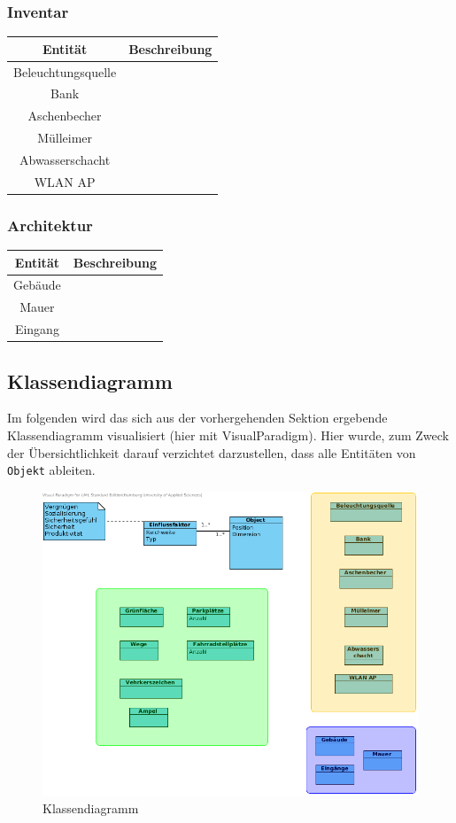 \documentclass[10pt]{scrartcl}
\begin{document}
	\subsubsection{Inventar}
\begin{tabular}{|c|c|}
\hline Entität & Beschreibung \\
\hline
\hline Beleuchtungsquelle &  \\ 
\hline Bank &  \\ 
\hline Aschenbecher &  \\ 
\hline Mülleimer &  \\ 
\hline Abwasserschacht &  \\ 
\hline WLAN AP &  \\ 
\hline 
\end{tabular}

	\subsubsection{Architektur}
\begin{tabular}{|c|c|}
\hline Entität & Beschreibung \\
\hline	
\hline Gebäude &  \\ 
\hline Mauer &  \\ 
\hline Eingang &  \\ 
\hline 
\end{tabular} 

	\subsection{Klassendiagramm}
	Im folgenden wird das sich aus der vorhergehenden Sektion ergebende Klassendiagramm visualisiert (hier mit VisualParadigm).
	Hier wurde, zum Zweck der Übersichtlichkeit darauf verzichtet darzustellen, dass alle Entitäten von \verb!Objekt! ableiten.
      \begin{figure}[Htp]
        \centering
                \includegraphics[scale=0.6]{img/ClassDiagram.png}
        \caption{Klassendiagramm}
        \label{img:classDiagram}
        \end{figure}  	
	 
\end{document}
